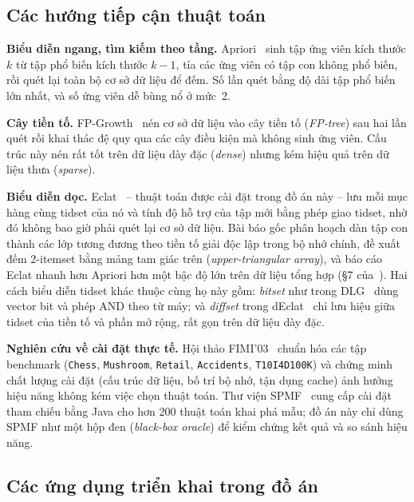 \subsection{Các hướng tiếp cận thuật toán}
\label{subsec:fim_approaches}

\textbf{Biểu diễn ngang, tìm kiếm theo tầng.} Apriori~\cite{agrawal1994fast} sinh tập ứng viên kích thước $k$ từ tập phổ biến kích thước $k-1$, tỉa các ứng viên có tập con không phổ biến, rồi quét lại toàn bộ cơ sở dữ liệu để đếm. Số lần quét bằng độ dài tập phổ biến lớn nhất, và số ứng viên dễ bùng nổ ở mức~2.

\textbf{Cây tiền tố.} FP-Growth~\cite{han2000mining} nén cơ sở dữ liệu vào cây tiền tố (\emph{FP-tree}) sau hai lần quét rồi khai thác đệ quy qua các cây điều kiện mà không sinh ứng viên. Cấu trúc này nén rất tốt trên dữ liệu dày đặc (\emph{dense}) nhưng kém hiệu quả trên dữ liệu thưa (\emph{sparse}).

\textbf{Biểu diễn dọc.} Eclat~\cite{zaki2000scalable} -- thuật toán được cài đặt trong đồ án này -- lưu mỗi mục hàng cùng tidset của nó và tính độ hỗ trợ của tập mới bằng phép giao tidset, nhờ đó không bao giờ phải quét lại cơ sở dữ liệu. Bài báo gốc phân hoạch dàn tập con thành các lớp tương đương theo tiền tố giải độc lập trong bộ nhớ chính, đề xuất đếm 2-itemset bằng mảng tam giác trên (\emph{upper-triangular array}), và báo cáo Eclat nhanh hơn Apriori hơn một bậc độ lớn trên dữ liệu tổng hợp (§7 của~\cite{zaki2000scalable}). Hai cách biểu diễn tidset khác thuộc cùng họ này gồm: \emph{bitset} như trong DLG~\cite{yen1996efficient} dùng vector bit và phép AND theo từ máy; và \emph{diffset} trong dEclat~\cite{zaki2003fast} chỉ lưu hiệu giữa tidset của tiền tố và phần mở rộng, rất gọn trên dữ liệu dày đặc.

\textbf{Nghiên cứu về cài đặt thực tế.} Hội thảo FIMI'03~\cite{goethals2004advances} chuẩn hóa các tập benchmark (\texttt{Chess}, \texttt{Mushroom}, \texttt{Retail}, \texttt{Accidents}, \texttt{T10I4D100K}) và chứng minh chất lượng cài đặt (cấu trúc dữ liệu, bố trí bộ nhớ, tận dụng cache) ảnh hưởng hiệu năng không kém việc chọn thuật toán. Thư viện SPMF~\cite{fournier2014spmf} cung cấp cài đặt tham chiếu bằng Java cho hơn 200 thuật toán khai phá mẫu; đồ án này chỉ dùng SPMF như một hộp đen (\emph{black-box oracle}) để kiểm chứng kết quả và so sánh hiệu năng.

\subsection{Các ứng dụng triển khai trong đồ án}
\label{subsec:applications_background}

